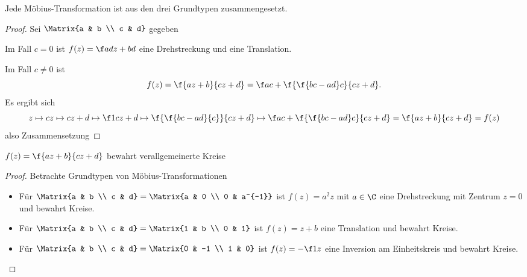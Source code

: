 \begin{lem}
	Jede Möbius-Transformation ist aus den drei Grundtypen zusammengesetzt.
	\begin{proof}
		Sei $\Matrix{a & b \\ c & d}$ gegeben

		Im Fall $c = 0$ ist $f(z) = \f a d z + bd$ eine Drehstreckung und eine Translation.

		Im Fall $c \neq 0$ ist
		\[
			f(z) = \f {az + b}{cz + d}
			= \f ac + \f {\f {bc - ad}c}{cz + d}.
		\]
		Es ergibt sich
		\[
			z \mapsto c z \mapsto c z + d \mapsto \f 1{cz + d} \mapsto \f{\f{bc - ad}{c}}{cz + d} \mapsto \f ac + \f{\f{bc-ad}c}{cz+d} = \f {az + b}{cz + d} = f(z)
		\]
		also Zusammensetzung
	\end{proof}
\end{lem}

\begin{lem}
	$f(z) = \f {az + b} {cz + d}$ bewahrt verallgemeinerte Kreise
	\begin{proof}
		Betrachte Grundtypen von Möbius-Transformationen
		\begin{itemize}
			\item
				Für $\Matrix{a & b \\ c & d} = \Matrix{a & 0 \\ 0 & a^{-1}}$ ist $f(z) = a^2 z$ mit $a \in \C$ eine Drehstreckung mit Zentrum $z=0$ und bewahrt Kreise.
			\item
				Für $\Matrix{a & b \\ c & d} = \Matrix{1 & b \\ 0 & 1}$ ist $f(z) = z + b$ eine Translation und bewahrt Kreise.
			\item
				Für $\Matrix{a & b \\ c & d} = \Matrix{0 & -1 \\ 1 & 0}$ ist $f(z) = - \f 1z$ eine Inversion am Einheitskreis und bewahrt Kreise.
		\end{itemize}
	\end{proof}
\end{lem}


